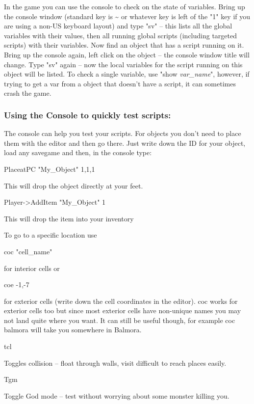 \documentclass[
]{article}
\begin{document}
In the game you can use the console to check on the state of variables.
Bring up the console window (standard key is \textasciitilde{} or
whatever key is left of the "1" key if you are using a non-US keyboard
layout) and type "sv" -- this lists all the global variables with their
values, then all running global scripts (including targeted scripts)
with their variables. Now find an object that has a script running on
it. Bring up the console again, left click on the object -- the console
window title will change. Type "sv" again -- now the local variables for
the script running on this object will be listed. To check a single
variable, use "show \emph{var\_name}", however, if trying to get a var
from a object that doesn't have a script, it can sometimes crash the
game.

\hypertarget{using-the-console-to-quickly-test-scripts}{%
\subsubsection{Using the Console to quickly test
scripts:}\label{using-the-console-to-quickly-test-scripts}}

The console can help you test your scripts. For objects you don't need
to place them with the editor and then go there. Just write down the ID
for your object, load any savegame and then, in the console type:

PlaceatPC "My\_Object" 1,1,1

This will drop the object directly at your feet.

Player-\textgreater AddItem "My\_Object" 1

This will drop the item into your inventory

To go to a specific location use

coc "cell\_name"

for interior cells or

coe -1,-7

for exterior cells (write down the cell coordinates in the editor). coc
works for exterior cells too but since most exterior cells have
non-unique names you may not land quite where you want. It can still be
useful though, for example coc balmora will take you somewhere in
Balmora.

tcl

Toggles collision -- float through walls, visit difficult to reach
places easily.

Tgm

Toggle God mode -- test without worrying about some monster killing you.
\end{document}
